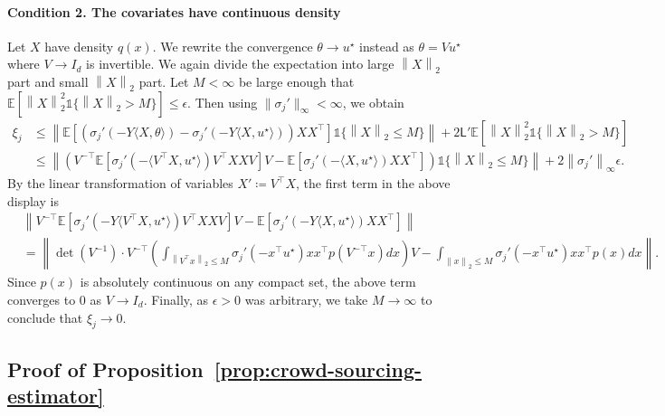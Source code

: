 \documentclass[11pt]{article}
\newcommand{\ind}{\mathds{1}}
\newcommand{\Ep}{\mathbb{E}}
\newcommand{\E}{\mathbb{E}}
\newcommand{\prn}[1]{\left({#1}\right)} %
\newcommand{\brk}[1]{\left[{#1}\right]} %
\newcommand{\norm}[1]{\left\|{#1}\right\|} %
\newcommand{\lipconst}{\mathsf{L}}
\newcommand{\ltwo}[1]{\norm{#1}_2} %
\newcommand{\linf}[1]{\norm{#1}_\infty} %
\newcommand{\norms}[1]{\|{#1}\|} %
\newcommand{\linfs}[1]{\norms{#1}_\infty} %
\newcommand{\<}{\langle} %
\renewcommand{\>}{\rangle}
\newcommand{\defeq}{\coloneqq}
\newcommand{\opt}{^\star}
\begin{document}
\paragraph{Condition 2. The covariates have continuous density}
Let $X$ have density $q(x)$. We rewrite the convergence
$\theta \to u\opt$ instead as $\theta
= V u\opt$ where $V \to I_d$ is invertible. We again divide the expectation
into large $\ltwo{X}$ part and small $\ltwo{X}$ part. Let
$M < \infty$ be large enough that $\E[\ltwo{X}^2 \ind\{\ltwo{X} > M\}]
\le \epsilon$. Then using $\linfs{\sigma_j'} < \infty$,
we obtain
\begin{align*}
  \xi_j & \leq \norm{\E\left[(\sigma_j'(-Y\<X, \theta\>) -{\sigma_j}'(-Y\<X, u\opt\>)) XX^\top \right] \ind \{\ltwo{X} \leq M\}} + 2 \lipconst'
  \Ep \brk{\ltwo{X}^2 \ind \{\ltwo{X} > M\}} \nonumber \\
  & \le \norm{ \prn{V^{-\top} \E\left[\sigma_j'(-\<V^\top X, u\opt\>) V^\top X XV \right] V - \E\left[{\sigma_j}'(-\<X, u\opt\>)XX^\top \right]}  \ind \{\ltwo{X} \leq M\}}  + 2 \linf{\sigma_j'} \epsilon.
\end{align*}
By the linear transformation of variables $X' \defeq V^\top X$, the first
term in the above display is
\begin{align*}
	&\norm{ V^{-\top} \E\left[\sigma_j'(-Y\<V^\top X, u\opt\>) V^\top X XV \right] V - \E\left[{\sigma_j}'(-Y\<X, u\opt\>)XX^\top \right]} \nonumber \\
	&= \norm{\det(V^{-1}) \cdot V^{-\top} \prn{\int_{\ltwo{V^\top x} \leq M} \sigma_j'(-x^\top u\opt) xx^\top p(V^{-\top} x) dx}  V - \int_{\ltwo{x} \leq M} \sigma_j'(-x^\top u\opt) xx^\top p(x) dx}.
\end{align*}
Since $p(x)$ is absolutely continuous on any compact set, the above term
converges to $0$ as $V \to I_d$. Finally, as $\epsilon > 0$ was arbitrary,
we take $M \to \infty$ to conclude that $\xi_j \to 0$.

\subsection{Proof of Proposition~\ref{prop:crowd-sourcing-estimator}} \label{proof:crowd-sourcing-estimator}
\end{document}
